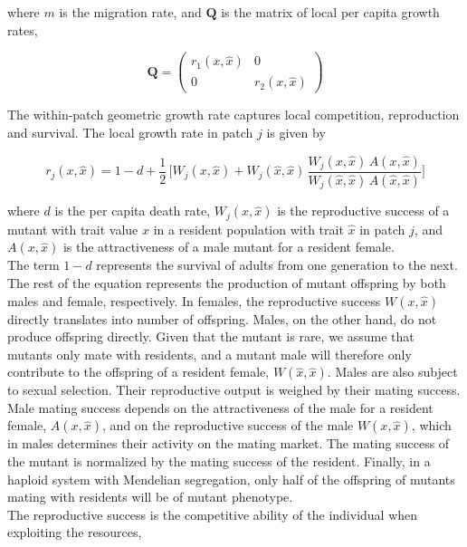 where $m$ is the migration rate, and $\pmb{Q}$ is the matrix of local per capita growth rates,

\begin{equation}
    \pmb{Q} =
    \begin{pmatrix}
        r_1(x, \hat{x}) & 0 \\
        0 & r_2(x, \hat{x})
    \end{pmatrix}
\end{equation}

The within-patch geometric growth rate captures local competition, reproduction and survival. The local growth rate in patch $j$ is given by

\begin{equation}
    r_j(x, \hat{x}) = 1 - d + \frac{1}{2} \, \Bigg[ W_j(x, \hat{x}) + W_j(\hat{x}, \hat{x}) \, \frac{W_j(x, \hat{x})\,A(x,\hat{x})}{W_j(\hat{x}, \hat{x})\,A(\hat{x},\hat{x})}\Bigg]
    \label{eq:growth_rate}
\end{equation}

where $d$ is the per capita death rate, $W_j(x,\hat{x})$ is the reproductive success of a mutant with trait value $x$ in a resident population with trait $\hat{x}$ in patch $j$, and $A(x, \hat{x})$ is the attractiveness of a male mutant for a resident female.\\

The term $1-d$ represents the survival of adults from one generation to the next. The rest of the equation represents the production of mutant offspring by both males and female, respectively. In females, the reproductive success $W(x, \hat{x})$ directly translates into number of offspring. Males, on the other hand, do not produce offspring directly. Given that the mutant is rare, we assume that mutants only mate with residents, and a mutant male will therefore only contribute to the offspring of a resident female, $W(\hat{x}, \hat{x})$. Males are also subject to sexual selection. Their reproductive output is weighed by their mating success. Male mating success depends on the attractiveness of the male for a resident female, $A(x, \hat{x})$, and on the reproductive success of the male $W(x, \hat{x})$, which in males determines their activity on the mating market. The mating success of the mutant is normalized by the mating success of the resident. Finally, in a haploid system with Mendelian segregation, only half of the offspring of mutants mating with residents will be of mutant phenotype.\\

The reproductive success is the competitive ability of the individual when exploiting the resources,


